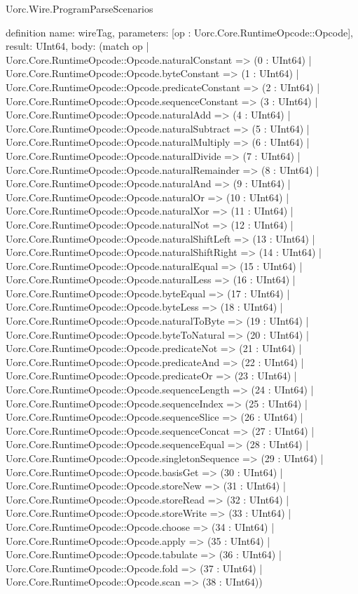 \begin{lexlean}{Uorc.Wire.ProgramParseScenarios}
\begin{semanticmodule}
definition{
  name: wireTag,
  parameters: [op : Uorc.Core.RuntimeOpcode::Opcode],
  result: UInt64,
  body: (match op
    | Uorc.Core.RuntimeOpcode::Opcode.naturalConstant => (0 : UInt64)
    | Uorc.Core.RuntimeOpcode::Opcode.byteConstant => (1 : UInt64)
    | Uorc.Core.RuntimeOpcode::Opcode.predicateConstant => (2 : UInt64)
    | Uorc.Core.RuntimeOpcode::Opcode.sequenceConstant => (3 : UInt64)
    | Uorc.Core.RuntimeOpcode::Opcode.naturalAdd => (4 : UInt64)
    | Uorc.Core.RuntimeOpcode::Opcode.naturalSubtract => (5 : UInt64)
    | Uorc.Core.RuntimeOpcode::Opcode.naturalMultiply => (6 : UInt64)
    | Uorc.Core.RuntimeOpcode::Opcode.naturalDivide => (7 : UInt64)
    | Uorc.Core.RuntimeOpcode::Opcode.naturalRemainder => (8 : UInt64)
    | Uorc.Core.RuntimeOpcode::Opcode.naturalAnd => (9 : UInt64)
    | Uorc.Core.RuntimeOpcode::Opcode.naturalOr => (10 : UInt64)
    | Uorc.Core.RuntimeOpcode::Opcode.naturalXor => (11 : UInt64)
    | Uorc.Core.RuntimeOpcode::Opcode.naturalNot => (12 : UInt64)
    | Uorc.Core.RuntimeOpcode::Opcode.naturalShiftLeft => (13 : UInt64)
    | Uorc.Core.RuntimeOpcode::Opcode.naturalShiftRight => (14 : UInt64)
    | Uorc.Core.RuntimeOpcode::Opcode.naturalEqual => (15 : UInt64)
    | Uorc.Core.RuntimeOpcode::Opcode.naturalLess => (16 : UInt64)
    | Uorc.Core.RuntimeOpcode::Opcode.byteEqual => (17 : UInt64)
    | Uorc.Core.RuntimeOpcode::Opcode.byteLess => (18 : UInt64)
    | Uorc.Core.RuntimeOpcode::Opcode.naturalToByte => (19 : UInt64)
    | Uorc.Core.RuntimeOpcode::Opcode.byteToNatural => (20 : UInt64)
    | Uorc.Core.RuntimeOpcode::Opcode.predicateNot => (21 : UInt64)
    | Uorc.Core.RuntimeOpcode::Opcode.predicateAnd => (22 : UInt64)
    | Uorc.Core.RuntimeOpcode::Opcode.predicateOr => (23 : UInt64)
    | Uorc.Core.RuntimeOpcode::Opcode.sequenceLength => (24 : UInt64)
    | Uorc.Core.RuntimeOpcode::Opcode.sequenceIndex => (25 : UInt64)
    | Uorc.Core.RuntimeOpcode::Opcode.sequenceSlice => (26 : UInt64)
    | Uorc.Core.RuntimeOpcode::Opcode.sequenceConcat => (27 : UInt64)
    | Uorc.Core.RuntimeOpcode::Opcode.sequenceEqual => (28 : UInt64)
    | Uorc.Core.RuntimeOpcode::Opcode.singletonSequence => (29 : UInt64)
    | Uorc.Core.RuntimeOpcode::Opcode.basisGet => (30 : UInt64)
    | Uorc.Core.RuntimeOpcode::Opcode.storeNew => (31 : UInt64)
    | Uorc.Core.RuntimeOpcode::Opcode.storeRead => (32 : UInt64)
    | Uorc.Core.RuntimeOpcode::Opcode.storeWrite => (33 : UInt64)
    | Uorc.Core.RuntimeOpcode::Opcode.choose => (34 : UInt64)
    | Uorc.Core.RuntimeOpcode::Opcode.apply => (35 : UInt64)
    | Uorc.Core.RuntimeOpcode::Opcode.tabulate => (36 : UInt64)
    | Uorc.Core.RuntimeOpcode::Opcode.fold => (37 : UInt64)
    | Uorc.Core.RuntimeOpcode::Opcode.scan => (38 : UInt64))
}


\end{semanticmodule}
\end{lexlean}
